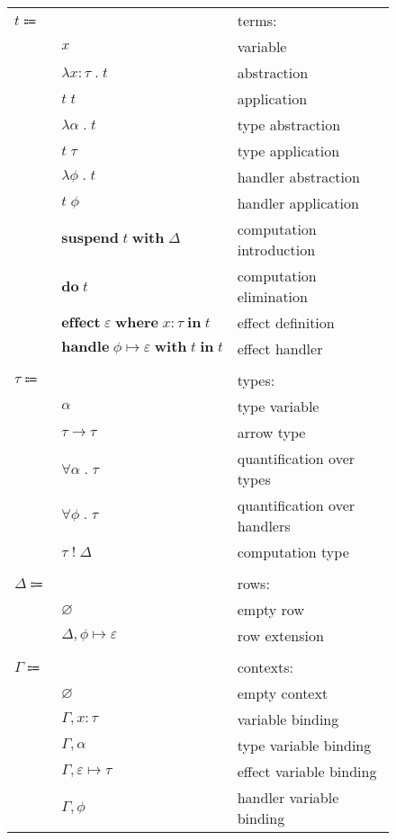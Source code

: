 \documentclass[12pt]{article}
\newcommand\anno[2]{#1 : #2}
\newcommand\xVar{\varepsilon}
\newcommand\hVar{\phi}
\newcommand\hToX[2]{#1 \mapsto #2}
\newcommand\row{\Delta}
\newcommand\rEmpty{\varnothing}
\newcommand\rExtend[3]{#1, \hToX{#2}{#3}}
\newcommand\term{t}
\newcommand\eVar{x}
\newcommand\eAbs[3]{\lambda \anno{#1}{#2} \; . \; #3}
\newcommand\eApp[2]{#1 \; #2}
\newcommand\eTAbs[2]{\lambda #1 \; . \; #2}
\newcommand\eTApp[2]{#1 \; #2}
\newcommand\eHAbs[2]{\lambda #1 \; . \; #2}
\newcommand\eHApp[2]{#1 \; #2}
\newcommand\eSuspend[2]{\textbf{suspend} \; #1 \; \textbf{with} \; #2}
\newcommand\eDo[1]{\textbf{do} \; #1}
\newcommand\eEffect[4]{\textbf{effect} \; #1 \; \textbf{where} \; \anno{#2}{#3} \; \textbf{in} \; #4}
\newcommand\eHandle[4]{\textbf{handle} \; \hToX{#1}{#2} \; \textbf{with} \; #3 \; \textbf{in} \; #4}
\newcommand\type{\tau}
\newcommand\tVar{\alpha}
\newcommand\tArrow[2]{#1 \rightarrow #2}
\newcommand\tTForAll[2]{\forall #1 \; . \; #2}
\newcommand\tHForAll[2]{\forall #1 \; . \; #2}
\newcommand\tComputation[2]{#1 \; ! \; #2}
\newcommand\context{\Gamma}
\newcommand\cEmpty{\varnothing}
\newcommand\cEExtend[3]{#1, \anno{#2}{#3}}
\newcommand\cTExtend[2]{#1, #2}
\newcommand\cXExtend[3]{#1, #2 \mapsto #3}
\newcommand\cHExtend[2]{#1, #2}
\begin{document}
      \begin{figure}[H]
        \begin{mdframed}[backgroundcolor=none]
          \begin{center}
            \begin{tabular}{l l l}
              $\term \Coloneqq$ & & terms: \\
              & $\eVar$ & variable \\
              & $\eAbs{\eVar}{\type}{\term}$ & abstraction \\
              & $\eApp{\term}{\term}$ & application \\
              & $\eTAbs{\tVar}{\term}$ & type abstraction \\
              & $\eTApp{\term}{\type}$ & type application \\
              & $\eHAbs{\hVar}{\term}$ & handler abstraction \\
              & $\eHApp{\term}{\hVar}$ & handler application \\
              & $\eSuspend{\term}{\row}$ & computation introduction \\
              & $\eDo{\term}$ & computation elimination \\
              & $\eEffect{\xVar}{\eVar}{\type}{\term}$ & effect definition \\
              & $\eHandle{\hVar}{\xVar}{\term}{\term}$ & effect handler \\
              \\
              $\type \Coloneqq$ & & types: \\
              & $\tVar$ & type variable \\
              & $\tArrow{\type}{\type}$ & arrow type \\
              & $\tTForAll{\tVar}{\type}$ & quantification over types \\
              & $\tHForAll{\hVar}{\type}$ & quantification over handlers \\
              & $\tComputation{\type}{\row}$ & computation type \\
              \\
              $\row \Coloneqq$ & & rows: \\
              & $\rEmpty$ & empty row \\
              & $\rExtend{\row}{\hVar}{\xVar}$ & row extension \\
              \\
              $\context \Coloneqq$ & & contexts: \\
              & $\cEmpty$ & empty context \\
              & $\cEExtend{\context}{\eVar}{\type}$ & variable binding \\
              & $\cTExtend{\context}{\tVar}$ & type variable binding \\
              & $\cXExtend{\context}{\xVar}{\type}$ & effect variable binding \\
              & $\cHExtend{\context}{\hVar}$ & handler variable binding \\
            \end{tabular}
          \end{center}


\end{mdframed}
\end{figure}
\end{document}
